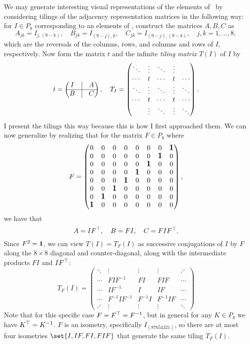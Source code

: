 We may generate interesting visual representations of the elements of \IsomC\ by considering
tilings of the adjacency representation matrices in the following way: for $I \in P_8$
corresponding to an elements of \IsomC, construct the matrices $A, B, C$ as
\[
A_{jk} = I_{j,(9-k)},\quad B_{jk} = I_{(9-j),k},\quad C_{jk} = I_{(9-j),(9-k)},\quad
j, k = 1,\dotsc,8,
\]
which are the reversals of the columns, rows, and columns and rows of $I$, respectively. Now
form the matrix $t$ and the infinite \emph{tiling matrix} $T(I)$ of $I$ by
\[
t = \begin{pmatrix}
I &\vline& A \\ \hline
B &\vline& C
\end{pmatrix},\quad
T_I = \begin{pmatrix}
\ddots&\vdots&\ddots&\vdots& \\
\cdots & t &\cdots& t & \cdots \\
\ddots&\vdots&\ddots&\vdots&\ddots \\
\cdots & t &\cdots& t & \cdots \\
&\vdots&\ddots&\vdots&\ddots
\end{pmatrix}.
\]
I present the tilings this way because this is how I first approached them. We can now
generalize by realizing that for the matrix $F \in P_8$ where
\[
F = \begin{pmatrix}
0 & 0 & 0 & 0 & 0 & 0 & 0 & \text{\large$\mathbf{1}$} \\
0 & 0 & 0 & 0 & 0 & 0 & \text{\large$\mathbf{1}$} & 0 \\
0 & 0 & 0 & 0 & 0 & \text{\large$\mathbf{1}$} & 0 & 0 \\
0 & 0 & 0 & 0 & \text{\large$\mathbf{1}$} & 0 & 0 & 0 \\
0 & 0 & 0 & \text{\large$\mathbf{1}$} & 0 & 0 & 0 & 0 \\
0 & 0 & \text{\large$\mathbf{1}$} & 0 & 0 & 0 & 0 & 0 \\
0 & \text{\large$\mathbf{1}$} & 0 & 0 & 0 & 0 & 0 & 0 \\
\text{\large$\mathbf{1}$} & 0 & 0 & 0 & 0 & 0 & 0 & 0
\end{pmatrix},
\]
we have that
\[ A = I\trans F,\quad B = FI,\quad C = FI\trans F. \]
Since $F^2 = \mathbf{1}$, we can view $T(I) = T_F(I)$ as successive conjugations of $I$ by $F$
along the $8\times8$ diagonal and counter-diagonal, along with the intermediate products $FI$
and $I\trans F$:
\[
T_F(I) = \begin{pmatrix}
\ddots  & \vdots        & \vdots  & \vdots   & \iddots \\
\cdots  &      FIF^{-1} & FI      &      FIF & \cdots  \\
\cdots  &       IF^{-1} & I       &       IF & \cdots  \\
\cdots  & F^{-1}IF^{-1} & F^{-1}I & F^{-1}IF & \cdots  \\
\iddots & \vdots        & \vdots  & \vdots   & \ddots
\end{pmatrix}
\]
Note that for this specific case $F = \trans F = F^{-1}$, but in general for any $K \in P_8$
we have $\trans K = K^{-1}$. $F$ is an isometry, specifically $I_{(87654321)}$, so there are
at most four isometries $\set{I, IF, FI, FIF}$ that generate the same tiling $T_F(I)$.

